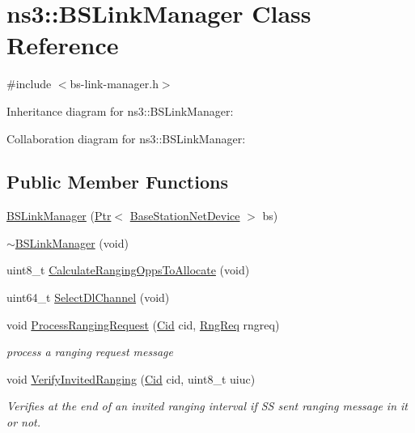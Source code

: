 \hypertarget{classns3_1_1BSLinkManager}{}\section{ns3\+:\+:B\+S\+Link\+Manager Class Reference}
\label{classns3_1_1BSLinkManager}


{\ttfamily \#include $<$bs-\/link-\/manager.\+h$>$}



Inheritance diagram for ns3\+:\+:B\+S\+Link\+Manager\+:


Collaboration diagram for ns3\+:\+:B\+S\+Link\+Manager\+:
\subsection*{Public Member Functions}
\begin{DoxyCompactItemize}
\item 
\hyperlink{classns3_1_1BSLinkManager_a1762bb84b94b68c245c6edd4b05f6512}{B\+S\+Link\+Manager} (\hyperlink{classns3_1_1Ptr}{Ptr}$<$ \hyperlink{classns3_1_1BaseStationNetDevice}{Base\+Station\+Net\+Device} $>$ bs)
\item 
\hyperlink{classns3_1_1BSLinkManager_ad55a3ee4c440183beaa4c084115a5484}{$\sim$\+B\+S\+Link\+Manager} (void)
\item 
uint8\+\_\+t \hyperlink{classns3_1_1BSLinkManager_a00df37e10ba0b3977b082b4026f34452}{Calculate\+Ranging\+Opps\+To\+Allocate} (void)
\item 
uint64\+\_\+t \hyperlink{classns3_1_1BSLinkManager_abbaa4459d0f6fb47f6ce7c8fb0269933}{Select\+Dl\+Channel} (void)
\item 
void \hyperlink{classns3_1_1BSLinkManager_a26c81a16faddfeedbe19e47f4158fbb0}{Process\+Ranging\+Request} (\hyperlink{classns3_1_1Cid}{Cid} cid, \hyperlink{classns3_1_1RngReq}{Rng\+Req} rngreq)
\begin{DoxyCompactList}\small\item\em process a ranging request message \end{DoxyCompactList}\item 
void \hyperlink{classns3_1_1BSLinkManager_a60a535b46cf80dcc0bfbd5132cb2da85}{Verify\+Invited\+Ranging} (\hyperlink{classns3_1_1Cid}{Cid} cid, uint8\+\_\+t uiuc)
\begin{DoxyCompactList}\small\item\em Verifies at the end of an invited ranging interval if SS sent ranging message in it or not. \end{DoxyCompactList}\end{DoxyCompactItemize}
